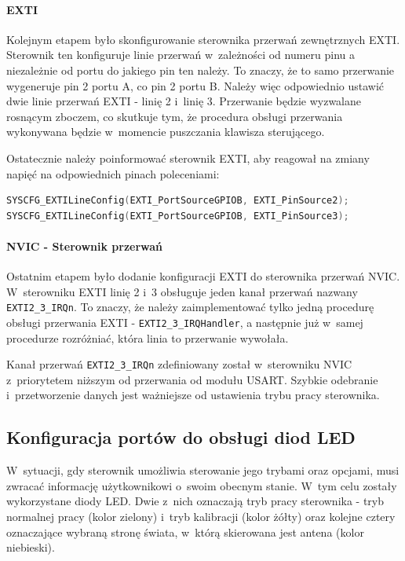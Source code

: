 \documentclass[eng,oneside]{mgr}
\begin{document}
				\paragraph{EXTI}
				Kolejnym etapem było skonfigurowanie sterownika przerwań zewnętrznych EXTI. Sterownik ten konfiguruje linie przerwań w~zależności od numeru pinu a niezależnie od portu do jakiego pin ten należy. To znaczy, że to samo przerwanie wygeneruje pin 2 portu A, co pin 2 portu B. Należy więc odpowiednio ustawić dwie linie przerwań EXTI - linię 2 i~linię 3. Przerwanie będzie wyzwalane rosnącym zboczem, co skutkuje tym, że procedura obsługi przerwania wykonywana będzie w~momencie puszczania klawisza sterującego.

				Ostatecznie należy poinformować sterownik EXTI, aby reagował na zmiany napięć na odpowiednich pinach poleceniami:

				\begin{lstlisting}[language=C, frame=single, caption=Dowiązanie pinów do sterownika EXTI]
SYSCFG_EXTILineConfig(EXTI_PortSourceGPIOB, EXTI_PinSource2);
SYSCFG_EXTILineConfig(EXTI_PortSourceGPIOB, EXTI_PinSource3);
				\end{lstlisting}

				\paragraph{NVIC - Sterownik przerwań}
				Ostatnim etapem było dodanie konfiguracji EXTI do sterownika przerwań NVIC. W~sterowniku EXTI linię 2 i~3 obsługuje jeden kanał przerwań nazwany \texttt{EXTI2\_3\_IRQn}. To znaczy, że należy zaimplementować tylko jedną procedurę obsługi przerwania EXTI - \texttt{EXTI2\_3\_IRQHandler}, a następnie już w~samej procedurze rozróżniać, która linia to przerwanie wywołała.

				Kanał przerwań \texttt{EXTI2\_3\_IRQn} zdefiniowany został w~sterowniku NVIC z~priorytetem niższym od przerwania od modułu USART. Szybkie odebranie i~przetworzenie danych jest ważniejsze od ustawienia trybu pracy sterownika.


			\subsection{Konfiguracja portów do obsługi diod LED}
			W~sytuacji, gdy sterownik umożliwia sterowanie jego trybami oraz opcjami, musi zwracać informację użytkownikowi o~swoim obecnym stanie. W~tym celu zostały wykorzystane diody LED. Dwie z~nich oznaczają tryb pracy sterownika - tryb normalnej pracy (kolor zielony) i~tryb kalibracji (kolor żółty) oraz kolejne cztery oznaczające wybraną stronę świata, w~którą skierowana jest antena (kolor niebieski).
\end{document}
